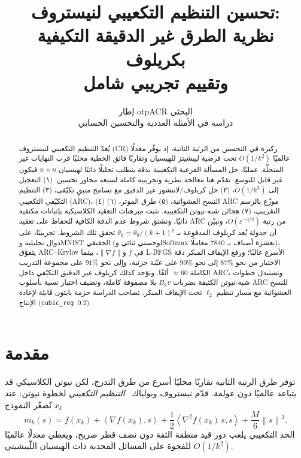 \documentclass[11pt,a4paper]{article}
\title{\textbf{تحسين التنظيم التكعيبي لنيستروف:\\
نظرية الطرق غير الدقيقة التكيفية بكريلوف\\
وتقييم تجريبي شامل}}
\author{إطار otpACR البحثي\\
\small دراسة في الأمثلة العددية والتحسين الحسابي}
\date{}
\theoremstyle{plain}
\theoremstyle{definition}
\newcommand{\norm}[1]{\left\|#1\right\|}
\newcommand{\inner}[2]{\left\langle #1,#2\right\rangle}
\newcommand{\grad}{\nabla}
\newcommand{\hess}{\nabla^{2}}
\begin{document}
\maketitle

\begin{abstract}
يُعدّ التنظيم التكعيبي لنيستروف (CR) ركيزة في التحسين من الرتبة الثانية، إذ يوفّر معدلًا عالميًا $O(1/k^{2})$ تحت فرضية ليبشيتز للهيسيان وتقاربًا فائق الخطية محليًا قرب النهايات غير المنحلّة.
عمليًا، حل المسألة الفرعية التكعيبية بدقة يتطلب تحليلًا ذاتيًا لهيسيان $n\times n$ فيكون غير قابل للتوسع.
نقدّم هنا معالجة نظرية وتجريبية كاملة لسبعة محاور تحسين: (١) التعجيل إلى $O(1/k^{3})$، (٢) حل كريلوف/لانتشوز غير الدقيق مع تسامح متبقٍ تكيّفي، (٣) التنظيم التكيّفي التكعيبي (ARC)، (٤) النسخ العشوائية، (٥) طرق الموتر، (٦) ARC موزّع بالرسم التقريبي، (٧) هجائن شبه-نيوتن التكعيبية.
نثبت مبرهنات التعقيد الكلاسيكية بإثباتات مكتفية ذاتيًا، ونشتق شروط عدم الدقة الكافية للحفاظ على تعقيد ARC من رتبة $O(\varepsilon^{-3/2})$، ونبيّن أن جدولة بُعد كريلوف المدفوعة بـ $\theta_{k}=\theta_{0}/(k+1)^{p}$ تحقق تلك الشروط.
تجريبيًا، على دوال تحليلية وMNIST الحقيقي (لوجستي ثنائي وSoftmax بعشرة أصناف بـ $7840$ معاملًا)، يتفوّق ARC--Krylov في $f$ و$\norm{\grad f}$، بينما L-BFGS الأسرع غالبًا؛ ورفع الإيقاف المبكر دقة الاختبار من نحو $87\%$ إلى نحو $90\%$ على عيّنة جزئية، وإلى نحو $91\%$ على مجموعة التدريب الكاملة $\approx 60$ ألفًا.
ونوّحد كذلك كريلوف غير الدقيق التكيّفي داخل ARC، ونستبدل خطوات شبه-نيوتن الكثيفة بضربات $B_{k}v$ بلا مصفوفة كاملة، ونضيف اختبار نسبة بأسلوب ARC للنسخ العشوائية مع مسار تنظيم $\ell_{2}$ تحت الإيقاف المبكر.
تصاحب الدراسة حزمة بايثون قابلة لإعادة الإنتاج (\textenglish{\texttt{cubic\_reg}}~$0.2$).
\end{abstract}

\tableofcontents
\newpage

\section{مقدمة}
توفر طرق الرتبة الثانية تقاربًا محليًا أسرع من طرق التدرج، لكن نيوتن الكلاسيكي قد يتباعد عالميًا دون عولمة.
قدّم نيستروف وبولياك~\cite{nesterov2006cubic} \emph{التنظيم التكعيبي} لخطوة نيوتن: عند $x_{k}$ نُصغّر النموذج
\begin{equation}
\label{eq:cubic-model}
m_{k}(s)
=
f(x_{k})
+
\inner{\grad f(x_{k})}{s}
+
\frac12\inner{\hess f(x_{k})\,s}{s}
+
\frac{M}{6}\norm{s}^{3}.
\end{equation}
الحد التكعيبي يلعب دور قيد منطقة الثقة دون نصف قطر صريح، ويعطي معدلًا عالميًا $O(1/k^{2})$ للفجوة على المسائل المحدبة ذات الهيسيان اللّيبشيتي.
\end{document}
